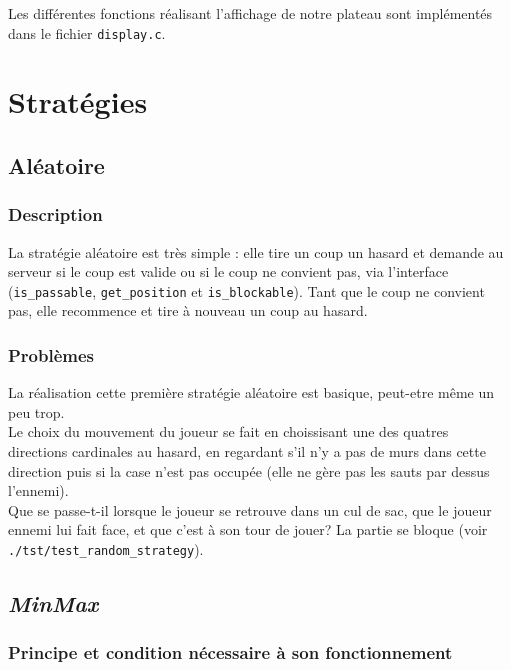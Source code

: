 \documentclass[12pt,a4paper]{article}
\begin{document}
\newpage
Les différentes fonctions réalisant l'affichage de notre plateau sont 
implémentés dans le fichier \verb,display.c,.

\section{Stratégies}

\subsection{Aléatoire}
\subsubsection{Description}
La stratégie aléatoire est très simple : elle tire un coup un hasard et demande 
au serveur si le coup est valide ou si le coup ne convient pas, via l'interface  
(\verb,is_passable,,
 \verb,get_position, et \verb,is_blockable,).
Tant que le coup ne convient pas, elle recommence et tire à nouveau un coup au 
hasard.

\subsubsection{Problèmes}

La réalisation cette première stratégie aléatoire est basique, peut-etre même 
un peu trop.\\

Le choix du mouvement du joueur se fait en choissisant une des quatres 
directions cardinales au hasard, en regardant s'il n'y a pas de murs dans cette 
direction puis si la case n'est pas occupée (elle ne gère pas les sauts par 
dessus l'ennemi).\\

Que se passe-t-il lorsque le joueur se retrouve dans un cul  de sac, que le 
joueur  ennemi lui fait face, et que c'est à son  tour de jouer? La partie se 
bloque (voir \verb,./tst/test_random_strategy,).\\

\subsection{\textit{MinMax}}

\subsubsection{Principe et condition nécessaire à son fonctionnement}
\end{document}
